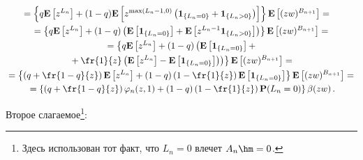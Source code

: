 \noindent

\begin{multline*}

\hspace*{-10pt}{}=\left\{q\mathbf{E}\left[z^{L_n}\right]+(1-q)\mathbf{E}\left[

z^{\max(L_n-1,0)}\left(\mathbf{1}_{\{L_n=0\}}+\mathbf{1}_{\{L_n>0\}}\right)\right]\right\}\mathbf{E}\left[(zw)^{B_{n+1}}\right]={}\\

{}=\left\{q\mathbf{E}\left[z^{L_n}\right]+(1-q)\left(\mathbf{E}\left[\mathbf{1}_{\{L_n=0\}}\right]+\mathbf{E}\left[z^{L_n-1}\mathbf{1}_{\{L_n>0\}}\right]\right)\right\}\mathbf{E}\left[(zw)^{B_{n+1}}\right]={}\\

{}=\left\{q\mathbf{E}\left[z^{L_n}\right]+(1-q)\left(

\vphantom{\fr{1}{z}}

\mathbf{E}\left[\mathbf{1}_{\{L_n=0\}}\right]

+\right.\right.\\

\left.\left.{}+

\fr{1}{z}\left(\mathbf{E}\left[z^{L_n}\right]-\mathbf{E}\left[\mathbf{1}_{\{L_n=0\}}\right]\right)\right)\right\}\mathbf{E}\left[(zw)^{B_{n+1}}\right]={}\\

{}=\left\{\left(q+\fr{1-q}{z}\right)\mathbf{E}\left[z^{L_n}\right]+(1-q)\left(1-\fr{1}{z}\right)\mathbf{E}\left[\mathbf{1}_{\{L_n=0\}}\right]\right\}\mathbf{E}\left[(zw)^{B_{n+1}}\right]={}\\

{}=\left\{\left(q+\fr{1-q}{z}\right)\varphi_n(z,1)+(1-q)\left(1-\fr{1}{z}\right)\mathbf{P}(L_n=0)\right\}\beta(zw)\,.

\end{multline*}

Второе слагаемое\footnote{Здесь использован тот факт, что $L_n=0$ влечет $A_n\hm=0$.}:

